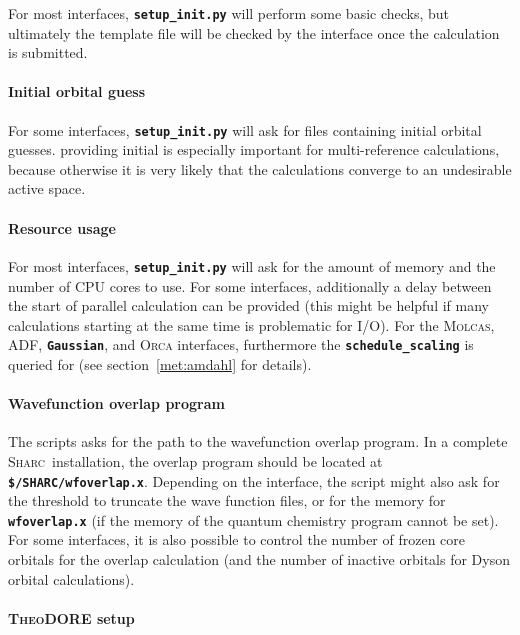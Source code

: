 \documentclass[a4paper,10pt,DIV=15,openany]{scrbook}
\newcommand{\sharc}{\textsc{Sharc}}
\newcommand{\ttt}[1]{\textbf{\texttt{#1}}}
\begin{document}
For most interfaces, \ttt{setup\_init.py} will perform some basic checks, but ultimately the template file will be checked by the interface once the calculation is submitted.

\paragraph{Initial orbital guess}

For some interfaces, \ttt{setup\_init.py} will ask for files containing initial orbital guesses. providing initial is especially important for multi-reference calculations, because otherwise it is very likely that the calculations converge to an undesirable active space.

\paragraph{Resource usage}

For most interfaces, \ttt{setup\_init.py} will ask for the amount of memory and the number of CPU cores to use. For some interfaces, additionally a delay between the start of parallel calculation can be provided (this might be helpful if many calculations starting at the same time is problematic for I/O).
For the \textsc{Molcas}, ADF, \ttt{Gaussian}, and \textsc{Orca} interfaces, furthermore the \ttt{schedule\_scaling} is queried for (see section~\ref{met:amdahl} for details).

\paragraph{Wavefunction overlap program}

The scripts asks for the path to the wavefunction overlap program. In a complete \sharc\ installation, the overlap program should be located at \ttt{\$/SHARC/wfoverlap.x}.
Depending on the interface, the script might also ask for the threshold to truncate the wave function files, or for the memory for \ttt{wfoverlap.x} (if the memory of the quantum chemistry program cannot be set).
For some interfaces, it is also possible to control the number of frozen core orbitals for the overlap calculation (and the number of inactive orbitals for Dyson orbital calculations).

\paragraph{\textsc{TheoDORE} setup}
\end{document}
